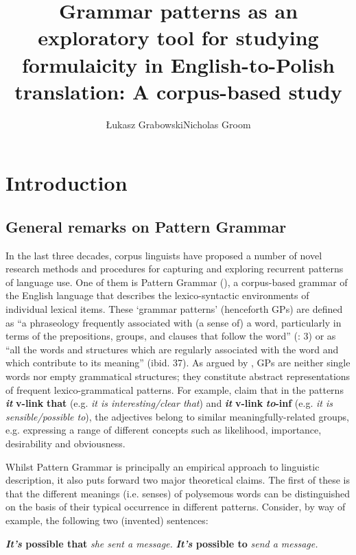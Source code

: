 \documentclass[output=paper]{langscibook}
\author{Łukasz Grabowski\affiliation{University of Opole}\orcid{}\lastand Nicholas Groom\affiliation{University of Birmingham}\orcid{}}
\title[Grammar patterns as a tool for studying formulaicity in Eng-Pol translation]{Grammar patterns as an exploratory tool for studying formulaicity in English-to-Polish translation: A corpus-based study }
\begin{document}
\maketitle 

\section{Introduction}
\subsection{General remarks on Pattern Grammar}

In the last three decades, corpus linguists have proposed a number of novel research methods and procedures for capturing and exploring recurrent patterns of language use. One of them is Pattern Grammar (\citealt{HunstonFrancis2000}), a corpus-based grammar of the English language that describes the lexico-syntactic environments of individual lexical items. These ‘grammar patterns’ (henceforth GPs) are defined as “a phraseology frequently associated with (a sense of) a word, particularly in terms of the prepositions, groups, and clauses that follow the word” (\citealt{HunstonFrancis2000}: 3) or as “all the words and structures which are regularly associated with the word and which contribute to its meaning” (ibid. 37). As argued by \citet[142]{Römer2009}, GPs are neither single words nor empty grammatical structures; they constitute abstract representations of frequent lexico-grammatical patterns. For example, \citet[29]{HunstonFrancis2000} claim that in the patterns \textbf{\textit{it} }\textbf{v-link} \textbf{{\ADJ}} \textbf{that} (e.g. \textit{it is interesting/clear that})  and \textbf{\textit{it} }\textbf{v-link} \textbf{{\ADJ}} \textbf{\textit{to}}\textbf{{}-inf} (e.g. \textit{it is sensible/possible to}), the adjectives belong to similar meaningfully-related groups, e.g. expressing a range of different concepts such as likelihood, importance, desirability and obviousness.

Whilst Pattern Grammar is principally an empirical approach to linguistic description, it also puts forward two major theoretical claims. The first of these is that the different meanings (i.e. senses) of polysemous words can be distinguished on the basis of their typical occurrence in different patterns. Consider, by way of example, the following two (invented) sentences: 

\ea \textbf{\textit{It’s} \textbf{possible} \textbf{that}} \textit{she sent a message.} \label{ex:grabowski:1}
\ex \textbf{\textit{It’s} \textbf{possible} \textbf{to}} \textit{send a message.} \label{ex:grabowski:2}
\z
\end{document}
